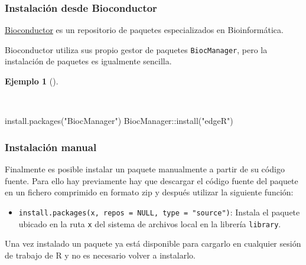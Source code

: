 \documentclass[
  a4paper,
]{scrreport}
\newenvironment{Shaded}{\begin{snugshade}}{\end{snugshade}}
\newcommand{\FunctionTok}[1]{\textcolor[rgb]{0.28,0.35,0.67}{#1}}
\newcommand{\NormalTok}[1]{\textcolor[rgb]{0.00,0.23,0.31}{#1}}
\newcommand{\SpecialCharTok}[1]{\textcolor[rgb]{0.37,0.37,0.37}{#1}}
\newcommand{\StringTok}[1]{\textcolor[rgb]{0.13,0.47,0.30}{#1}}
\providecommand{\tightlist}{%
  \setlength{\itemsep}{0pt}\setlength{\parskip}{0pt}}\usepackage{longtable,booktabs,array}
\theoremstyle{definition}
\theoremstyle{definition}
\newtheorem{example}{Ejemplo}[chapter]
\theoremstyle{remark}
\begin{document}
\hypertarget{instalaciuxf3n-desde-bioconductor}{%
\subsubsection{Instalación desde
Bioconductor}\label{instalaciuxf3n-desde-bioconductor}}

\href{https://bioconductor.org/}{Bioconductor} es un repositorio de
paquetes especializados en Bioinformática.

Bioconductor utiliza sus propio gestor de paquetes \texttt{BiocManager},
pero la instalación de paquetes es igualmente sencilla.

\begin{example}[]\protect\hypertarget{exm-instalacion-paquetes-bioconductor}{}\label{exm-instalacion-paquetes-bioconductor}

~

\begin{Shaded}
\begin{Highlighting}[]
\FunctionTok{install.packages}\NormalTok{(}\StringTok{"BiocManager"}\NormalTok{)}
\NormalTok{BiocManager}\SpecialCharTok{::}\FunctionTok{install}\NormalTok{(}\StringTok{"edgeR"}\NormalTok{)}
\end{Highlighting}
\end{Shaded}

\end{example}

\hypertarget{instalaciuxf3n-manual}{%
\subsubsection{Instalación manual}\label{instalaciuxf3n-manual}}

Finalmente es posible instalar un paquete manualmente a partir de su
código fuente. Para ello hay previamente hay que descargar el código
fuente del paquete en un fichero comprimido en formato zip y después
utilizar la siguiente función:

\begin{itemize}
\tightlist
\item
  \texttt{install.packages(x,\ repos\ =\ NULL,\ type\ =\ "source")}:
  Instala el paquete ubicado en la ruta \texttt{x} del sistema de
  archivos local en la librería \texttt{library}.
\end{itemize}

Una vez instalado un paquete ya está disponible para cargarlo en
cualquier sesión de trabajo de R y no es necesario volver a instalarlo.
\end{document}
